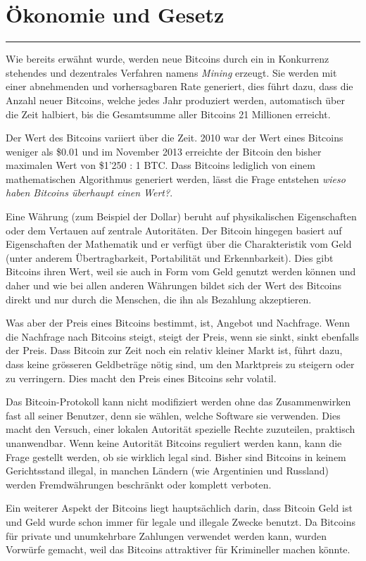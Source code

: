 \section*{Ökonomie und Gesetz}
\vspace{-10mm}
\noindent\rule{0.8\textwidth}{0.4pt}

\vspace{5mm}

\noindent
Wie bereits erwähnt wurde, werden neue Bitcoins durch ein in Konkurrenz stehendes und
dezentrales Verfahren namens \emph{Mining} erzeugt. Sie werden mit einer abnehmenden
und vorhersagbaren Rate generiert, dies führt dazu, dass die Anzahl neuer Bitcoins,
welche jedes Jahr produziert werden, automatisch über die Zeit halbiert, bis die Gesamtsumme
aller Bitcoins 21 Millionen erreicht.

\noindent
Der Wert des Bitcoins variiert über die Zeit. 2010 war der Wert eines Bitcoins weniger
als \$0.01 und im November 2013 erreichte der Bitcoin den bisher maximalen Wert
von \$1'250 : 1 BTC. Dass Bitcoins lediglich von einem mathematischen Algorithmus
generiert werden, lässt die Frage entstehen \emph{\dq wieso haben Bitcoins
überhaupt einen Wert?\dq}.

\noindent
Eine Währung (zum Beispiel der Dollar) beruht auf physikalischen Eigenschaften oder dem Vertauen
auf zentrale Autoritäten. Der Bitcoin hingegen basiert auf Eigenschaften der Mathematik und
er verfügt über die Charakteristik vom Geld (unter anderem Übertragbarkeit, Portabilität und
Erkennbarkeit). Dies gibt Bitcoins ihren Wert, weil sie auch in Form vom Geld genutzt werden
können und daher und wie bei allen anderen Währungen bildet sich der Wert des Bitcoins direkt und
nur durch die Menschen, die ihn als Bezahlung akzeptieren.

\noindent
Was aber der Preis eines Bitcoins bestimmt, ist, Angebot und Nachfrage. Wenn die Nachfrage nach
Bitcoins steigt, steigt der Preis, wenn sie sinkt, sinkt ebenfalls der Preis. Dass Bitcoin zur Zeit
noch ein relativ kleiner Markt ist, führt dazu, dass keine grösseren Geldbeträge nötig sind, um den
Marktpreis zu steigern oder zu verringern. Dies macht den Preis eines Bitcoins sehr volatil.

\noindent
Das Bitcoin-Protokoll kann nicht modifiziert werden ohne das Zusammenwirken fast all seiner Benutzer,
denn sie wählen, welche Software sie verwenden. Dies macht den Versuch, einer lokalen Autorität
spezielle Rechte zuzuteilen, praktisch unanwendbar. Wenn keine Autorität Bitcoins reguliert werden kann,
kann die Frage gestellt werden, ob sie wirklich legal sind. Bisher sind Bitcoins in keinem Gerichtsstand
illegal, in manchen Ländern (wie Argentinien und Russland) werden Fremdwährungen beschränkt oder
komplett verboten.

\noindent
Ein weiterer Aspekt der Bitcoins liegt hauptsächlich darin, dass Bitcoin Geld ist und Geld wurde
schon immer für legale und illegale Zwecke benutzt. Da Bitcoins für private und unumkehrbare Zahlungen
verwendet werden kann, wurden Vorwürfe gemacht, weil das Bitcoins attraktiver für Krimineller machen
könnte.

\newpage
